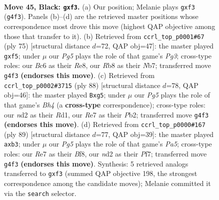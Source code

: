 \documentclass[11pt]{article}
\begin{document}
\clearpage

\begin{figure}[p]\centering
\begin{subfigure}{0.46\textwidth}\centering
\resizebox{\linewidth}{!}{%
\newchessgame
\chessboard[
  setfen={1r6/4r3/1pb4k/p1p1n3/6p1/2P2BP1/1K1N3P/4R1NR b - - 3 45},
  showmover=false,
  pgfstyle=straightmove, color=movearrow, markmove={g4-f3}
]}
\caption{}
\end{subfigure}\hfill
\begin{subfigure}{0.46\textwidth}\centering
\resizebox{\linewidth}{!}{%
\newchessgame
\chessboard[
  setfen={4r1k1/1n6/1n1pN1p1/3P1B1p/2p2P2/2N1R1P1/5K2/8 b - - 0 38},
  showmover=false,
  pgfstyle=straightmove, color=movearrow, markmove={g6-f5}
]}
\caption{}
\end{subfigure}
\\[4pt]
\begin{subfigure}{0.46\textwidth}\centering
\resizebox{\linewidth}{!}{%
\newchessgame
\chessboard[
  setfen={3r1b2/r6k/1pBP3p/4p1n1/p3N2B/2P2P2/1P4K1/3R4 w - - 6 45},
  showmover=false,
  pgfstyle=straightmove, color=movearrow, markmove={h4-g5}
]}
\caption{}
\end{subfigure}\hfill
\begin{subfigure}{0.46\textwidth}\centering
\resizebox{\linewidth}{!}{%
\newchessgame
\chessboard[
  setfen={5b1k/5pp1/7p/6nP/p2B2P1/1B1n4/2N2P2/5R1K b - - 0 45},
  showmover=false,
  pgfstyle=straightmove, color=movearrow, markmove={a4-b3}
]}
\caption{}
\end{subfigure}
\caption{\textbf{Move 45, Black: \texttt{gxf3}.} (a) Our position; Melanie plays \texttt{gxf3} (\texttt{g4f3}). Panels (b)--(d) are the retrieved master positions whose correspondence most drove this move (highest QAP objective among those that transfer to it). (b) Retrieved from \texttt{ccrl\_top\_p0001\#67} (ply 75) [structural distance $d$=72, QAP obj=47]: the master played \texttt{gxf5}; under $\mu$ our \emph{Pg5} plays the role of that game's \emph{Pg3}; cross-type roles: our \emph{B}c6 as their \emph{R}e8, our \emph{R}b8 as their \emph{N}b7; transferred move \texttt{g4f3} \textbf{(endorses this move)}. (c) Retrieved from \texttt{ccrl\_top\_p0002\#3715} (ply 88) [structural distance $d$=78, QAP obj=46]: the master played \texttt{Bxg5}; under $\mu$ our \emph{Pg5} plays the role of that game's \emph{Bh4} (a \textbf{cross-type} correspondence); cross-type roles: our \emph{n}d2 as their \emph{R}d1, our \emph{R}e7 as their \emph{P}b2; transferred move \texttt{g4f3} \textbf{(endorses this move)}. (d) Retrieved from \texttt{ccrl\_top\_p0000\#167} (ply 89) [structural distance $d$=77, QAP obj=39]: the master played \texttt{axb3}; under $\mu$ our \emph{Pg5} plays the role of that game's \emph{Pa5}; cross-type roles: our \emph{R}e7 as their \emph{B}f8, our \emph{n}d2 as their \emph{P}f7; transferred move \texttt{g4f3} \textbf{(endorses this move)}. Synthesis: 5 retrieved analogs transferred to \texttt{gxf3} (summed QAP objective 198, the strongest correspondence among the candidate moves); Melanie committed it via the \texttt{search} selector.}
\label{fig:thought-m89}
\end{figure}
\end{document}

